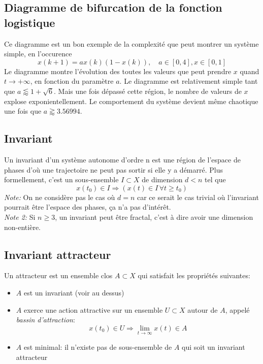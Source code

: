 \documentclass[a4paper]{article}
\begin{document}
\subsection{Diagramme de bifurcation de la fonction logistique}
Ce diagramme est un bon exemple de la complexité que peut montrer un
système simple, en l'occurence
\[x(k+1)=ax(k)(1-x(k)),\quad a\in[0,4],x\in[0,1]\]
Le diagramme montre l'évolution des toutes les valeurs que peut prendre
\(x\) quand \(t\to + \infty \), en fonction du paramètre \(a\).
Le diagramme est relativement simple tant que \(a\lessapprox 1+\sqrt{6}\).
Mais une fois dépassé cette région, le nombre de valeurs de \(x\) explose
exponientellement. Le comportement du système devient même chaotique une
fois que \(a \gtrapprox 3.56994\).

\subsection{Invariant}
Un invariant d'un système autonome d'ordre n est une région de l'espace de
phases d'où une trajectoire ne peut pas sortir si elle y a démarré. Plus
formellement, c'est un sous-ensemble \(I\subset X\) de dimension \(d < n\) tel
que \[x(t_0)\in I\Rightarrow (x(t)\in I\,\forall t \ge t_0)\]
\emph{Note:} On ne considère pas le cas où \(d=n\) car ce serait le cas
trivial où l'invariant pourrait être l'espace des phases, ça n'a pas
d'intérêt.\\
\emph{Note 2:} Si \(n \ge 3\), un invariant peut être fractal, c'est à dire
avoir une dimension non-entière.

\subsection{Invariant attracteur}
Un attracteur est un ensemble clos \(A \subset X\) qui satisfait les propriétés
suivantes:
\begin{itemize}
	\item \(A\) est un invariant (voir au dessus)
	\item \(A\) exerce une action attractive sur un ensemble \(U \subset X\)
		autour de \(A\), appelé \emph{bassin d'attraction}:
		\[x(t_0)\in U\Rightarrow \lim_{t\to\infty}x(t)\in A\]
	\item \(A\) est minimal: il n'existe pas de sous-ensemble de \(A\) qui soit
		un invariant attracteur
\end{itemize}
\end{document}
